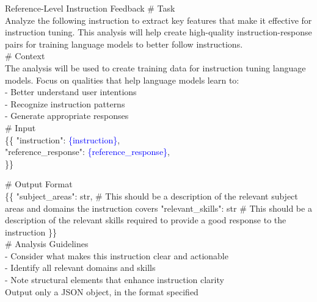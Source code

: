 \begin{promptbox}{Reference-Level Instruction Feedback}
\# Task \\
Analyze the following instruction to extract key features that make it effective for instruction tuning. This analysis will help create high-quality instruction-response pairs for training language models to better follow instructions. \\

\# Context \\
The analysis will be used to create training data for instruction tuning language models. Focus on qualities that help language models learn to: \\
- Better understand user intentions \\
- Recognize instruction patterns \\
- Generate appropriate responses \\

\# Input \\
\{\{
  "instruction": \textcolor{blue}{\{instruction\}}, \\
  "reference\_response": \textcolor{blue}{\{reference\_response\}}, \\
\}\}

\# Output Format \\
\{\{
  "subject\_areas": str, \# This should be a description of the relevant subject areas and domains the instruction covers
  "relevant\_skills": str \# This should be a description of the relevant skills required to provide a good response to the instruction
\}\} \\

\# Analysis Guidelines \\
- Consider what makes this instruction clear and actionable \\
- Identify all relevant domains and skills \\
- Note structural elements that enhance instruction clarity \\

Output only a JSON object, in the format specified
\end{promptbox}

